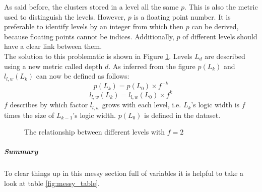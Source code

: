 \documentclass[10pt,a4paper,titlepage]{article}
\begin{document}
	As said before, the clusters stored in a level all the same \(p\). This is also the metric used to distinguish the levels. However, \(p\) is a floating point number. It is preferable to identify levels by an integer from which then \(p\) can be derived, because floating points cannot be indices. Additionally, \(p\) of different levels should have a clear link between them.\\
	The solution to this problematic is shown in Figure \ref{fig:levels_factor}. Levels \(L_d\) are described using a new metric called depth \(d\). As inferred from the figure \(p(L_k)\) and \(l_{l,w}(L_k)\) can now be defined as follows:
	\[p(L_k) = p(L_0) \times f ^ {-k}\]
	\[l_{l,w}(L_k) = l_{l,w}(L_0) \times f^k\]
	\(f\) describes by which factor \(l_{l,w}\) grows with each level, i.e. \(L_k\)'s logic width is \(f\) times the size of \(L_{k-1}\)'s logic width. \(p(L_0)\) is defined in the dataset.
	\begin{figure}
		\centering
		\caption{The relationship between different levels with \(f = 2\)}
		\label{fig:levels_factor}
	\end{figure}
	\subparagraph{Summary}
	To clear things up in this messy section full of variables it is helpful to take a look at table \ref{fig:messy_table}.
\end{document}
